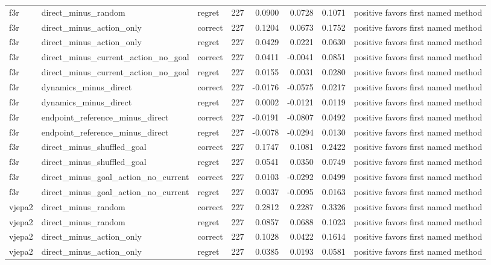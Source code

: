 \begin{tabular}{lllrrrrl}
f3r & direct\_minus\_random & regret & 227 & 0.0900 & 0.0728 & 0.1071 & positive favors first named method \\
f3r & direct\_minus\_action\_only & correct & 227 & 0.1204 & 0.0673 & 0.1752 & positive favors first named method \\
f3r & direct\_minus\_action\_only & regret & 227 & 0.0429 & 0.0221 & 0.0630 & positive favors first named method \\
f3r & direct\_minus\_current\_action\_no\_goal & correct & 227 & 0.0411 & -0.0041 & 0.0851 & positive favors first named method \\
f3r & direct\_minus\_current\_action\_no\_goal & regret & 227 & 0.0155 & 0.0031 & 0.0280 & positive favors first named method \\
f3r & dynamics\_minus\_direct & correct & 227 & -0.0176 & -0.0575 & 0.0217 & positive favors first named method \\
f3r & dynamics\_minus\_direct & regret & 227 & 0.0002 & -0.0121 & 0.0119 & positive favors first named method \\
f3r & endpoint\_reference\_minus\_direct & correct & 227 & -0.0191 & -0.0807 & 0.0492 & positive favors first named method \\
f3r & endpoint\_reference\_minus\_direct & regret & 227 & -0.0078 & -0.0294 & 0.0130 & positive favors first named method \\
f3r & direct\_minus\_shuffled\_goal & correct & 227 & 0.1747 & 0.1081 & 0.2422 & positive favors first named method \\
f3r & direct\_minus\_shuffled\_goal & regret & 227 & 0.0541 & 0.0350 & 0.0749 & positive favors first named method \\
f3r & direct\_minus\_goal\_action\_no\_current & correct & 227 & 0.0103 & -0.0292 & 0.0499 & positive favors first named method \\
f3r & direct\_minus\_goal\_action\_no\_current & regret & 227 & 0.0037 & -0.0095 & 0.0163 & positive favors first named method \\
vjepa2 & direct\_minus\_random & correct & 227 & 0.2812 & 0.2287 & 0.3326 & positive favors first named method \\
vjepa2 & direct\_minus\_random & regret & 227 & 0.0857 & 0.0688 & 0.1023 & positive favors first named method \\
vjepa2 & direct\_minus\_action\_only & correct & 227 & 0.1028 & 0.0422 & 0.1614 & positive favors first named method \\
vjepa2 & direct\_minus\_action\_only & regret & 227 & 0.0385 & 0.0193 & 0.0581 & positive favors first named method \\

\end{tabular}
